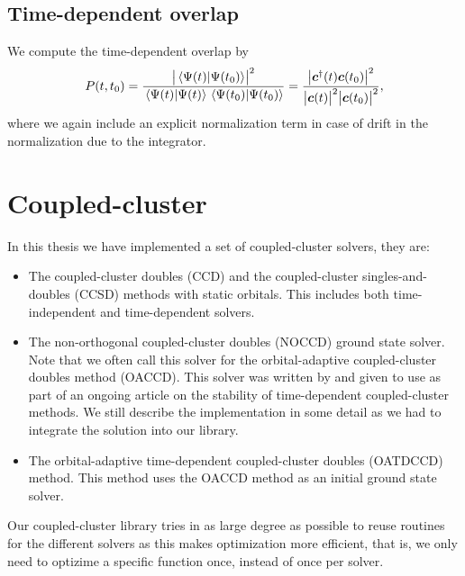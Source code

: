         \subsection{Time-dependent overlap}
            We compute the time-dependent overlap by
            \begin{align}
                P(t, t_0)
                =
                \frac{
                    \abs{\braket*{\Psi(t)}{\Psi(t_0)}}^2
                }{
                    \braket*{\Psi(t)}\braket*{\Psi(t_0)}
                }
                = \frac{
                    \abs{\boldsymbol{c}^{\dagger}(t)\boldsymbol{c}(t_0)}^2
                }{
                    \abs{\boldsymbol{c}(t)}^2
                    \abs{\boldsymbol{c}(t_0)}^2
                },
            \end{align}
            where we again include an explicit normalization term in case of
            drift in the normalization due to the integrator.

    \section{Coupled-cluster}
        \label{sec:cc-solver}
        In this thesis we have implemented a set of coupled-cluster solvers,
        they are:
        \begin{itemize}
            \item The coupled-cluster doubles (CCD) and the coupled-cluster
                singles-and-doubles (CCSD) methods with static orbitals.
                This includes both time-independent and time-dependent solvers.
            \item The non-orthogonal coupled-cluster doubles (NOCCD) ground
                state solver.
                Note that we often call this solver for the orbital-adaptive
                coupled-cluster doubles method (OACCD).
                This solver was written by \citeauthor{rolf-nocc}
                \cite{rolf-nocc} and given to use as part of an ongoing article
                on the stability of time-dependent coupled-cluster methods.
                We still describe the implementation in some detail as we had to
                integrate the solution into our library.
            \item The orbital-adaptive time-dependent coupled-cluster doubles
                (OATDCCD) method.
                This method uses the OACCD method as an initial ground state
                solver.
        \end{itemize}
        Our coupled-cluster library tries in as large degree as possible to
        reuse routines for the different solvers as this makes optimization
        more efficient, that is, we only need to optizime a specific function
        once, instead of once per solver.

